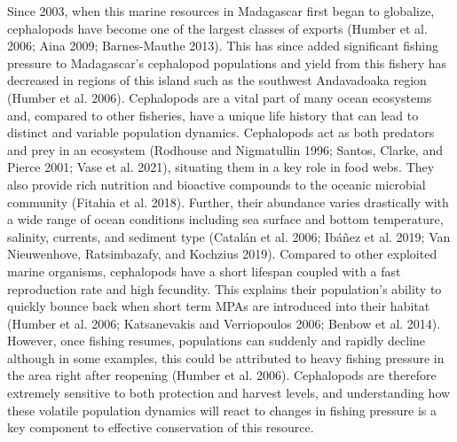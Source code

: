 \documentclass[
]{article}
\begin{document}
Since 2003, when this marine resources in Madagascar first began to globalize, cephalopods have become one of the largest classes of exports (Humber et al. 2006; Aina 2009; Barnes-Mauthe 2013). This has since added significant fishing pressure to Madagascar's cephalopod populations and yield from this fishery has decreased in regions of this island such as the southwest Andavadoaka region (Humber et al. 2006). Cephalopods are a vital part of many ocean ecosystems and, compared to other fisheries, have a unique life history that can lead to distinct and variable population dynamics. Cephalopods act as both predators and prey in an ecosystem (Rodhouse and Nigmatullin 1996; Santos, Clarke, and Pierce 2001; Vase et al. 2021), situating them in a key role in food webs. They also provide rich nutrition and bioactive compounds to the oceanic microbial community (Fitahia et al. 2018). Further, their abundance varies drastically with a wide range of ocean conditions including sea surface and bottom temperature, salinity, currents, and sediment type (Catalán et al. 2006; Ibáñez et al. 2019; Van Nieuwenhove, Ratsimbazafy, and Kochzius 2019). Compared to other exploited marine organisms, cephalopods have a short lifespan coupled with a fast reproduction rate and high fecundity. This explains their population's ability to quickly bounce back when short term MPAs are introduced into their habitat (Humber et al. 2006; Katsanevakis and Verriopoulos 2006; Benbow et al. 2014). However, once fishing resumes, populations can suddenly and rapidly decline although in some examples, this could be attributed to heavy fishing pressure in the area right after reopening (Humber et al. 2006). Cephalopods are therefore extremely sensitive to both protection and harvest levels, and understanding how these volatile population dynamics will react to changes in fishing pressure is a key component to effective conservation of this resource.
\end{document}
